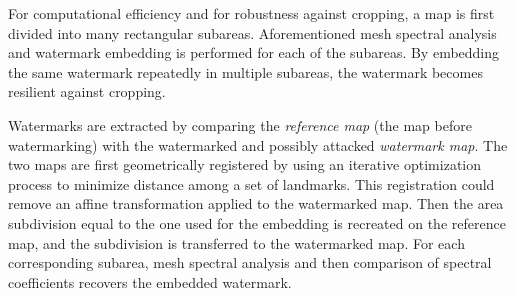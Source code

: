 \documentclass{article}
\begin{document}
For computational efficiency and for robustness against cropping, a map is first divided into many rectangular subareas. Aforementioned mesh spectral analysis and watermark embedding is performed 
for each of the subareas. By embedding the same watermark repeatedly in multiple subareas, the watermark becomes resilient against cropping.

Watermarks are extracted by comparing the \textit{reference map} (the map before watermarking) with the watermarked and possibly attacked \textit{watermark map}. The two maps are first geometrically registered by
using an iterative optimization process to minimize distance among a set of landmarks. This registration could remove an affine transformation applied to the watermarked map. Then the area subdivision 
equal to the one used for the embedding is recreated on the reference map, and the subdivision is transferred to the watermarked map. For each corresponding subarea, mesh spectral analysis and then comparison of
spectral coefficients recovers the embedded watermark.
\end{document}
